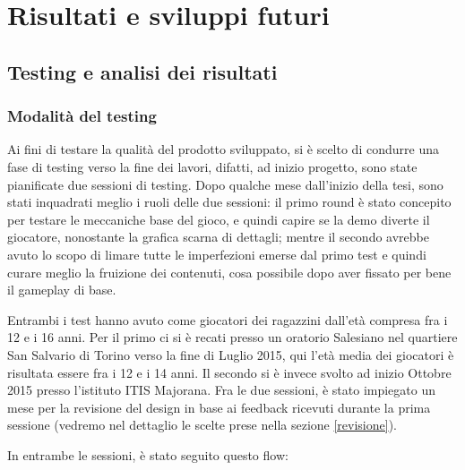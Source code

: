 \chapter{Risultati e sviluppi futuri}
\label{chap:risultati}

\section{Testing e analisi dei risultati}

\subsection{Modalità del testing}

Ai fini di testare la qualità del prodotto sviluppato, si è scelto di condurre una fase di testing verso la fine dei lavori, difatti, ad inizio progetto, sono state pianificate due sessioni di testing. Dopo qualche mese dall'inizio della tesi, sono stati inquadrati meglio i ruoli delle due sessioni: il primo round è stato concepito per testare le meccaniche base del gioco, e quindi capire se la demo diverte il giocatore, nonostante la grafica scarna di dettagli; mentre il secondo avrebbe avuto lo scopo di limare tutte le imperfezioni emerse dal primo test e quindi curare meglio la fruizione dei contenuti, cosa possibile dopo aver fissato per bene il gameplay di base.

Entrambi i test hanno avuto come giocatori dei ragazzini dall'età compresa fra i 12 e i 16 anni. Per il primo ci si è recati presso un oratorio Salesiano nel quartiere San Salvario di Torino verso la fine di Luglio 2015, qui l'età media dei giocatori è risultata essere fra i 12 e i 14 anni. Il secondo si è invece svolto ad inizio Ottobre 2015 presso l'istituto ITIS Majorana. Fra le due sessioni, è stato impiegato un mese per la revisione del design in base ai feedback ricevuti durante la prima sessione (vedremo nel dettaglio le scelte prese nella sezione \ref{revisione}).

In entrambe le sessioni, è stato seguito questo flow:

